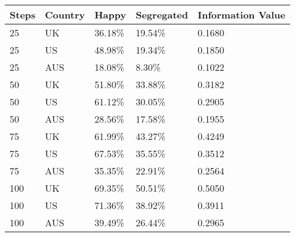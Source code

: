 \begin{table}[ht]
\centering
\begin{tabular}{lllll}
  \hline
Steps & Country & Happy & Segregated & Information Value \\ 
  \hline
25 & UK & 36.18\% & 19.54\% & 0.1680 \\ 
  25 & US & 48.98\% & 19.34\% & 0.1850 \\ 
  25 & AUS & 18.08\% & 8.30\% & 0.1022 \\ 
  50 & UK & 51.80\% & 33.88\% & 0.3182 \\ 
  50 & US & 61.12\% & 30.05\% & 0.2905 \\ 
  50 & AUS & 28.56\% & 17.58\% & 0.1955 \\ 
  75 & UK & 61.99\% & 43.27\% & 0.4249 \\ 
  75 & US & 67.53\% & 35.55\% & 0.3512 \\ 
  75 & AUS & 35.35\% & 22.91\% & 0.2564 \\ 
  100 & UK & 69.35\% & 50.51\% & 0.5050 \\ 
  100 & US & 71.36\% & 38.92\% & 0.3911 \\ 
  100 & AUS & 39.49\% & 26.44\% & 0.2965 \\ 
   \hline
\end{tabular}
\end{table}
